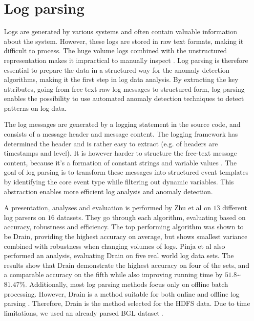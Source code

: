 \section{Log parsing}
Logs are generated by various systems and often contain valuable information about the system. However, these logs are stored in raw text formats, making it difficult to process. The huge volume logs combined with the unstructured representation makes it impractical to manually inspect \cite{zhu2019toolsbenchmarksautomatedlog}.  Log parsing is therefore essential to prepare the data in a structured way for the anomaly detection algorithms, making it the first step in log data analysis. By extracting the key attributes, going from free text raw-log messages to structured form, log parsing enables the possibility to use automated anomaly detection techniques to detect patterns on log data.

The log messages are generated by a logging statement in the source code, and consists of a message header and message content. The logging framework has determined the header and is rather easy to extract (e.g. of headers are timestamps and level). It is however harder to structure the free-text message content, because it's a formation of constant strings and variable values \cite{zhu2019toolsbenchmarksautomatedlog}. The goal of log parsing is to transform these messages into structured event templates by identifying the core event type while filtering out dynamic variables. This abstraction enables more efficient log analysis and anomaly detection.

A presentation, analyses and evaluation is performed by Zhu et al \cite{zhu2019toolsbenchmarksautomatedlog} on $13$ different log parsers on $16$ datasets. They go through each algorithm, evaluating based on accuracy, robustness and efficiency. The top performing algorithm was shown to be Drain, providing the highest accuracy on average, but shows smallest variance combined with robustness when changing volumes of logs. Pinja et al \cite{Pinja2017Drain} also performed an analysis, evaluating Drain on five real world log data sets. The results show that Drain demonstrate the highest accuracy on four of the sets, and a comparable accuracy on the fifth while also improving running time by $51.8$\textasciitilde $81.47$\%.  Additionally, most log parsing methods focus only on offline batch processing. However, Drain is a method suitable for both online and offline log parsing \cite{Pinja2017Drain}. Therefore, Drain is the method selected for the HDFS data. Due to time limitations, we used an already parsed BGL dataset \cite{4273008} \cite{zhu2023loghublargecollectionlog}.

